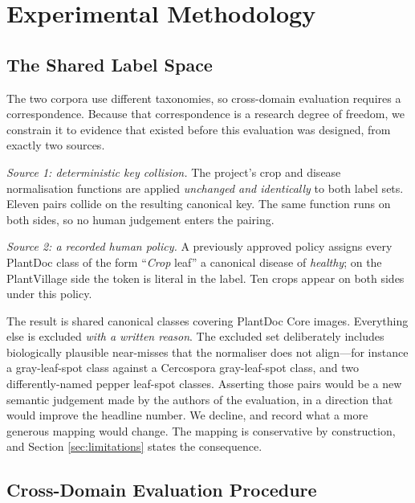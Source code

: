 \documentclass[runningheads]{llncs}
\begin{document}
\section{Experimental Methodology}

\subsection{The Shared Label Space}
\label{sec:mapping}

The two corpora use different taxonomies, so cross-domain evaluation requires a
correspondence. Because that correspondence is a research degree of freedom, we
constrain it to evidence that existed before this evaluation was designed, from
exactly two sources.

\emph{Source 1: deterministic key collision.} The project's crop and disease
normalisation functions are applied \emph{unchanged and identically} to both
label sets. Eleven pairs collide on the resulting canonical key. The same
function runs on both sides, so no human judgement enters the pairing.

\emph{Source 2: a recorded human policy.} A previously approved policy assigns
every PlantDoc class of the form ``\textit{Crop} leaf'' a canonical disease of
\textit{healthy}; on the PlantVillage side the token is literal in the label.
Ten crops appear on both sides under this policy.

The result is \NSharedClasses{} shared canonical classes covering \NXdImages{}
PlantDoc Core images. Everything else is excluded \emph{with a written reason}.
The excluded set deliberately includes biologically plausible near-misses that
the normaliser does not align---for instance a gray-leaf-spot class against a
Cercospora gray-leaf-spot class, and two differently-named pepper leaf-spot
classes. Asserting those pairs would be a new semantic judgement made by the
authors of the evaluation, in a direction that would improve the headline
number. We decline, and record what a more generous mapping would change. The
mapping is conservative by construction, and Section \ref{sec:limitations}
states the consequence.

\subsection{Cross-Domain Evaluation Procedure}
\end{document}
